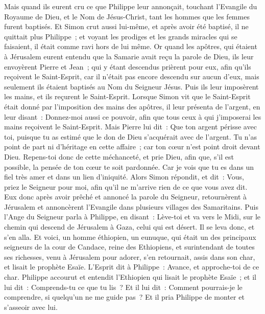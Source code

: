 \begin{multicols}{2}
Mais quand ils eurent cru ce que Philippe leur annonçait, touchant l'Evangile du Royaume de Dieu, et le Nom de Jésus-Christ, tant les hommes que les femmes furent baptisés.
Et Simon crut aussi lui-même, et après avoir été baptisé, il ne quittait plus Philippe~; et voyant les prodiges et les grands miracles qui se faisaient, il était comme ravi hors de lui même.
Or quand les apôtres, qui étaient à Jérusalem eurent entendu que la Samarie avait reçu la parole de Dieu, ils leur envoyèrent Pierre et Jean~;
qui y étant descendus prièrent pour eux, afin qu'ils reçoivent le Saint-Esprit,
car il n'était pas encore descendu sur aucun d'eux, mais seulement ils étaient baptisés au Nom du Seigneur Jésus.
Puis ils leur imposèrent les mains, et ils reçurent le Saint-Esprit.
Lorsque Simon vit que le Saint-Esprit était donné par l'imposition des mains des apôtres, il leur présenta de l'argent,
en leur disant~: Donnez-moi aussi ce pouvoir, afin que tous ceux à qui j'imposerai les mains reçoivent le Saint-Esprit.
Mais Pierre lui dit~: Que ton argent périsse avec toi, puisque tu as estimé que le don de Dieu s'acquérait avec de l'argent.
Tu n'as point de part ni d'héritage en cette affaire~; car ton cœur n'est point droit devant Dieu.
Repens-toi donc de cette méchanceté, et prie Dieu, afin que, s'il est possible, la pensée de ton cœur te soit pardonnée.
Car je vois que tu es dans un fiel très amer et dans un lien d'iniquité.
Alors Simon répondit, et dit~: Vous, priez le Seigneur pour moi, afin qu'il ne m'arrive rien de ce que vous avez dit. 
Eux donc après avoir prêché et annoncé la parole du Seigneur, retournèrent à Jérusalem et annoncèrent l'Evangile dans plusieurs villages des Samaritains.
Puis l'Ange du Seigneur parla à Philippe, en disant~: Lève-toi et va vers le Midi, sur le chemin qui descend de Jérusalem à Gaza, celui qui est désert.
Il se leva donc, et s'en alla. Et voici, un homme éthiopien, un eunuque, qui était un des principaux seigneurs de la cour de Candace, reine des Ethiopiens, et surintendant de toutes ses richesses, venu à Jérusalem pour adorer,
s'en retournait, assis dans son char, et lisait le prophète Esaïe.
L'Esprit dit à Philippe~: Avance, et approche-toi de ce char.
Philippe accourut et entendit l'Ethiopien qui lisait le prophète Esaïe~; et il lui dit~: Comprends-tu ce que tu lis~?
Et il lui dit~: Comment pourrais-je le comprendre, si quelqu'un ne me guide pas~? Et il pria Philippe de monter et s'asseoir avec lui.

\end{multicols}
